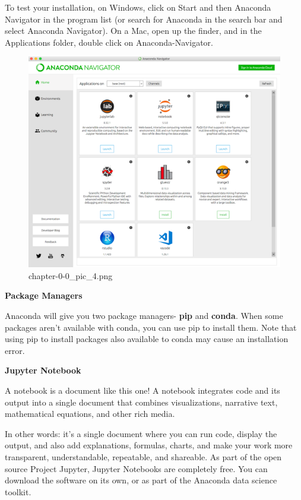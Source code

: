 \documentclass[11pt]{article}
\begin{document}
    To test your installation, on Windows, click on Start and then Anaconda
Navigator in the program list (or search for Anaconda in the search bar
and select Anaconda Navigator). On a Mac, open up the finder, and in the
Applications folder, double click on Anaconda-Navigator.

    \begin{figure}
\centering
\includegraphics{./pic/chapter-0-0_pic_4.png}
\caption{chapter-0-0\_pic\_4.png}
\end{figure}

    \textbf{Package Managers}

Anaconda will give you two package managers- \textbf{pip} and
\textbf{conda}. When some packages aren't available with conda, you can
use pip to install them. Note that using pip to install packages also
available to conda may cause an installation error.

    \textbf{Jupyter Notebook}

A notebook is a document like this one! A notebook integrates code and
its output into a single document that combines visualizations,
narrative text, mathematical equations, and other rich media.

In other words: it's a single document where you can run code, display
the output, and also add explanations, formulas, charts, and make your
work more transparent, understandable, repeatable, and shareable. As
part of the open source Project Jupyter, Jupyter Notebooks are
completely free. You can download the software on its own, or as part of
the Anaconda data science toolkit.
\end{document}
